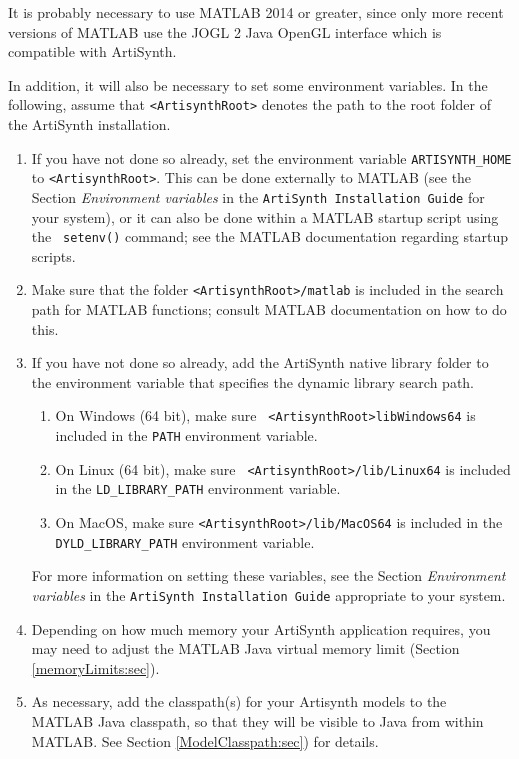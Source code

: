 \documentclass{article}
\begin{document}
It is probably necessary to use MATLAB 2014 or greater, since only
more recent versions of MATLAB use the JOGL 2 Java OpenGL interface
which is compatible with ArtiSynth.

In addition, it will also be necessary to set some environment
variables. In the following, assume that {\tt <ArtisynthRoot>} denotes
the path to the root folder of the ArtiSynth installation.

\begin{enumerate}

\item If you have not done so already, set the environment variable
{\tt ARTISYNTH\_HOME} to {\tt <ArtisynthRoot>}. This can be done
externally to MATLAB (see the Section {\it Environment variables} in
the {\tt ArtiSynth Installation Guide} for your system), or
it can also be done within a MATLAB startup script using the {\tt
setenv()} command; see the MATLAB documentation regarding startup scripts.

\item Make sure that the folder {\tt <ArtisynthRoot>/matlab} is
included in the search path for MATLAB functions; consult MATLAB
documentation on how to do this.

\item If you have not done so already, add the ArtiSynth native
library folder to the environment variable that specifies the dynamic
library search path. 

\begin{enumerate}

\item On Windows (64 bit), make sure {\tt
<ArtisynthRoot>\BKS lib\BKS Windows64} is included in the {\tt PATH}
environment variable.

\item On Linux (64 bit), make sure {\tt
<ArtisynthRoot>/lib/Linux64} is included in the {\tt LD\_LIBRARY\_PATH}
environment variable.

\item On MacOS, make sure {\tt <ArtisynthRoot>/lib/MacOS64} is
included in the {\tt DYLD\_LIBRARY\_PATH} environment variable.

\end{enumerate}

For more information on setting these variables, see the Section {\it
Environment variables} in the {\tt ArtiSynth Installation Guide}
appropriate to your system.

\item Depending on how much memory your ArtiSynth application requires,
you may need to adjust the MATLAB Java virtual memory limit (Section
\ref{memoryLimits:sec}).

\item As necessary, add the classpath(s) for your Artisynth models to
the MATLAB Java classpath, so that they will be visible to Java from
within MATLAB. See Section \ref{ModelClasspath:sec}) for details.

\end{enumerate}
\end{document}
